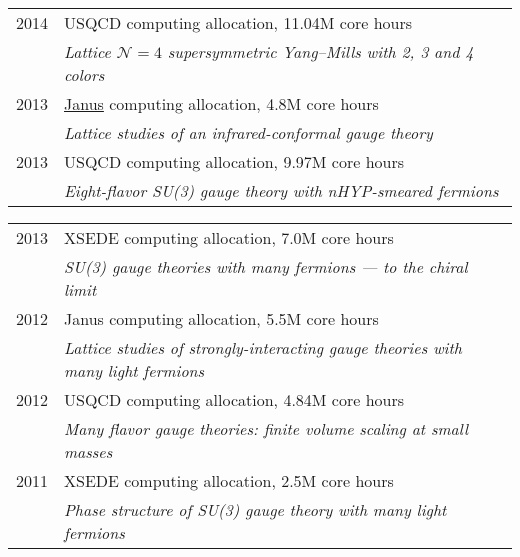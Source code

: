 \begin{spacelist}
\begin{tabular}[t]{cl}
      2014 & USQCD computing allocation, 11.04M core hours                                                            \\ %
           & \textit{Lattice $\mathcal N = 4$ supersymmetric Yang--Mills with 2, 3 and 4 colors}                      \\[6 pt]
      2013 & \href{https://www.top500.org/system/176922}{Janus} computing allocation, 4.8M core hours                 \\ %
           & \textit{Lattice studies of an infrared-conformal gauge theory}                                           \\[6 pt]
      2013 & USQCD computing allocation, 9.97M core hours                                                             \\ %
           & \textit{Eight-flavor SU(3) gauge theory with nHYP-smeared fermions}                                      \\[6 pt]
    \end{tabular} %
    \begin{tabular}[t]{cl}
      2013 & XSEDE computing allocation, 7.0M core hours                                                              \\ %
           & \textit{SU(3) gauge theories with many fermions --- to the chiral limit}                                 \\[6 pt]
      2012 & Janus computing allocation, 5.5M core hours                                                              \\ %
           & \textit{Lattice studies of strongly-interacting gauge theories with many light fermions}                 \\[6 pt]
      2012 & USQCD computing allocation, 4.84M core hours                                                             \\ %
           & \textit{Many flavor gauge theories: finite volume scaling at small masses}                               \\[6 pt]
      2011 & XSEDE computing allocation, 2.5M core hours                                                              \\ %
           & \textit{Phase structure of SU(3) gauge theory with many light fermions}                                  \\
    \end{tabular}


\end{spacelist}

